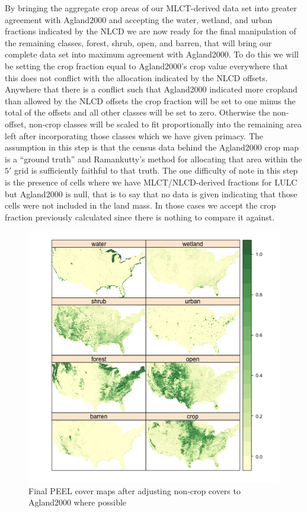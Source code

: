By bringing the aggregate crop areas of our MLCT-derived data set into
greater agreement with Agland2000 and accepting the water, wetland,
and urban fractions indicated by the NLCD we are now ready for the
final manipulation of the remaining classes, forest, shrub, open, and
barren, that will bring our complete data set into maximum agreement
with Agland2000.  To do this we will be setting the crop fraction
equal to Agland2000's crop value everywhere that this does not
conflict with the allocation indicated by the NLCD offsets.  Anywhere
that there is a conflict such that Agland2000 indicated more cropland
than allowed by the NLCD offsets the crop fraction will be set to one
minus the total of the offsets and all other classes will be set to
zero.  Otherwise the non-offset, non-crop classes will be scaled to
fit proportionally into the remaining area left after incorporating
those classes which we have given primacy.  The assumption in this step
is that the census data behind the Agland2000 crop map is a ``ground
truth'' and Ramankutty's method for allocating that area within the
$5'$ grid is sufficiently faithful to that truth.  The one difficulty
of note in this step is the presence of cells where we have
MLCT/NLCD-derived fractions for LULC but Agland2000 is null, that is
to say that no data is given indicating that those cells were not
included in the land mass.  In those cases we accept the crop fraction
previously calculated since there is nothing to compare it against.


\begin{figure}[hpt] 
  \centering


\includegraphics{fig_agc}
\caption{Final PEEL cover maps after adjusting non-crop covers to Agland2000 where possible} 
\label{fig:agc} 
\end{figure} 

